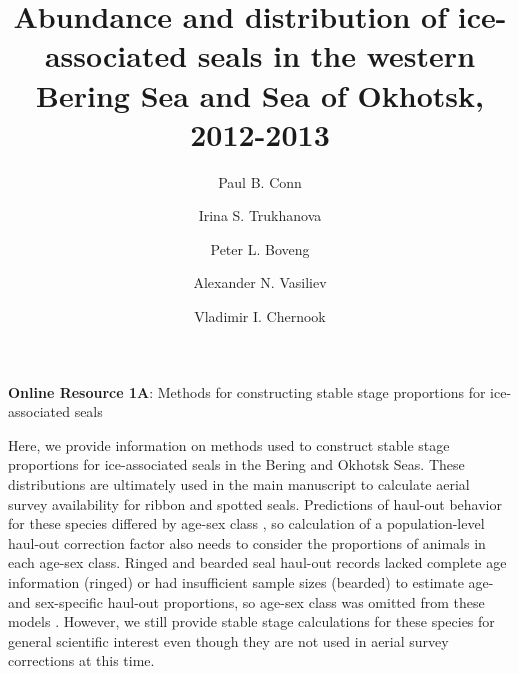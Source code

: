 \documentclass{svjour3}
\begin{document}
\title{Abundance and distribution of ice-associated seals in the western Bering Sea and Sea of Okhotsk, 2012-2013}

\author{Paul B. Conn \and
        Irina S. Trukhanova \and
        Peter L. Boveng \and
        Alexander N. Vasiliev \and
        Vladimir I. Chernook
}


\maketitle


\maketitle

\captionsetup{labelformat=empty}

\large
\bigskip
\textbf{Online Resource 1A}: Methods for constructing stable stage proportions for ice-associated seals
\bigskip
\small

Here, we provide information on methods used to construct stable stage proportions for ice-associated seals in the Bering and Okhotsk Seas. These distributions are ultimately used in the main manuscript to calculate aerial survey availability for ribbon and spotted seals.  Predictions of haul-out behavior for these species differed by age-sex class \citep{LondonEtAl2019}, so calculation of a population-level haul-out correction factor also needs to consider the proportions of animals in each age-sex class.  Ringed and bearded seal haul-out records lacked complete age information (ringed) or had insufficient sample sizes (bearded) to estimate age- and sex-specific haul-out proportions, so age-sex class was omitted from these models \citep{LondonEtAl2019, BovengEtAl2021b}.  However, we still provide stable stage calculations for these species for general scientific interest even though they are not used in aerial survey corrections at this time.
\end{document}
